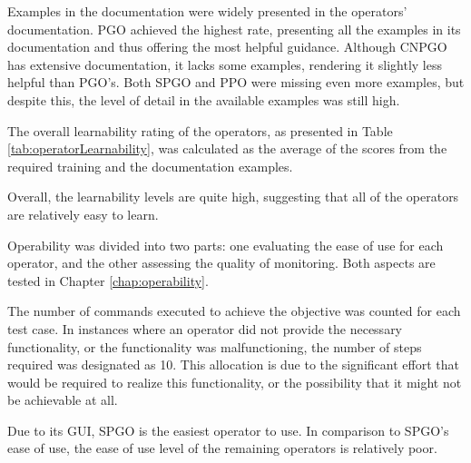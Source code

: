Examples in the documentation were widely presented in the operators' documentation.
PGO achieved the highest rate, presenting all the examples in its documentation and thus offering the most helpful guidance.
Although CNPGO has extensive documentation, it lacks some examples, rendering it slightly less helpful than PGO's.
Both SPGO and PPO were missing even more examples, but despite this, the level of detail in the available examples was still high.



The overall learnability rating of the operators, as presented in Table \ref{tab:operatorLearnability}, was calculated as the average of the scores from the required training and the documentation examples.

Overall, the learnability levels are quite high, suggesting that all of the operators are relatively easy to learn.



\label{chap:testOperatbility}
Operability was divided into two parts: one evaluating the ease of use for each operator, and the other assessing the quality of monitoring. Both aspects are tested in Chapter \ref{chap:operability}.

The number of commands executed to achieve the objective was counted for each test case. In instances where an operator did not provide the necessary functionality, or the functionality was malfunctioning, the number of steps required was designated as 10.
This allocation is due to the significant effort that would be required to realize this functionality, or the possibility that it might not be achievable at all.

Due to its GUI, SPGO is the easiest operator to use. In comparison to SPGO's ease of use, the ease of use level of the remaining operators is relatively poor.




